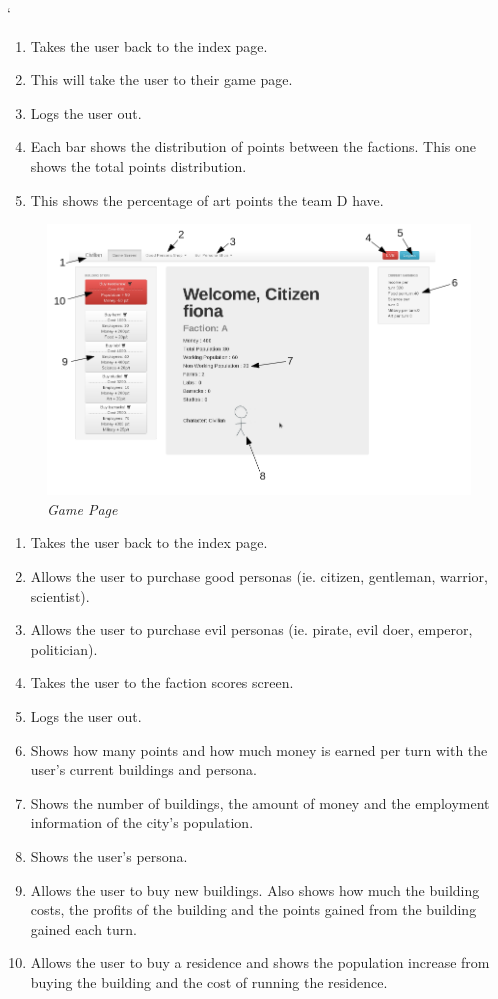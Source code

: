 `\documentclass{sig-alt-release2}
\begin{document}
\begin{enumerate}
\item Takes the user back to the index page. 
\item This will take the user to their game page.
\item Logs the user out.
\item Each bar shows the distribution of points between the factions. This one shows the total points distribution.
\item This shows the percentage of art points the team D have.
\end{enumerate}

\begin{figure}[!htbp]
  \caption{\textit{Game Page}}
  \begin{center}
		\includegraphics[scale=0.30]{img/gamelabel.png}
  \end{center}
\end{figure}

\begin{enumerate}
\item Takes the user back to the index page.
\item Allows the user to purchase good personas (ie. citizen, gentleman, warrior, scientist).
\item Allows the user to purchase evil personas (ie. pirate, evil doer, emperor, politician).
\item Takes the user to the faction scores screen.
\item Logs the user out.
\item Shows how many points and how much money is earned per turn with the user's current buildings and persona.
\item Shows the number of buildings, the amount of money and the employment information of the city's population.
\item Shows the user's persona.
\item Allows the user to buy new buildings. Also shows how much the building costs, the profits of the building and the points gained from the building gained each turn.
\item Allows the user to buy a residence and shows the population increase from buying the building and the cost of running the residence.
\end{enumerate}
\end{document}
